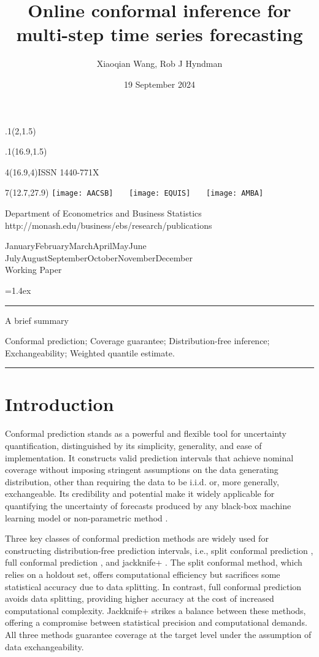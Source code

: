 \documentclass[
  11pt,
  a4paper,
]{article}
\title{Online conformal inference for multi-step time series
forecasting}
\date{19 September 2024}
\author{Xiaoqian Wang, Rob J Hyndman}
\makeatletter
\theoremstyle{plain}
\theoremstyle{remark}
\def\placefig#1#2#3#4{\begin{textblock}{.1}(#1,#2)\rlap{\texttt{[image: \#4]}}\end{textblock}}
\def\Date{\number\day}
\def\Month{\ifcase\month\or
 January\or February\or March\or April\or May\or June\or
 July\or August\or September\or October\or November\or December\fi}
\def\Year{\number\year}
\def\showjel{{\large\textsf{\textbf{JEL classification:}}~\@jel}}
\def\cover{{\sffamily\setcounter{page}{0}
        \thispagestyle{empty}
        \placefig{2}{1.5}{width=5cm}{monash2}
        \placefig{16.9}{1.5}{width=2.1cm}{MBSportrait}
        \begin{textblock}{4}(16.9,4)ISSN 1440-771X\end{textblock}
        \begin{textblock}{7}(12.7,27.9)\hfill
        \texttt{[image: AACSB]}~~~
        \texttt{[image: EQUIS]}~~~
        \texttt{[image: AMBA]}
        \end{textblock}
        \vspace*{2.5cm}
        \begin{center}\Large
        Department of Econometrics and Business Statistics\\[.5cm]
        \footnotesize http://monash.edu/business/ebs/research/publications
        \end{center}\vspace{2cm}
        \begin{center}
        \fbox{\parbox{14cm}{\begin{onehalfspace}\centering\Huge\vspace*{0.3cm}
                \textsf{\textbf{\expandafter{\@title}}}\vspace{1cm}\par
                \LARGE
                \expandafter{\@author}
                \end{onehalfspace}
        }}
        \end{center}
        \vfill
                \begin{center}\Large
                \Month~\Year\\[1cm]
                Working Paper \@wp
        \end{center}\vspace*{2cm}}}
\def\pageone{{\sffamily\setstretch{1}%
        \thispagestyle{empty}%
        \vbox to \textheight{%
        \raggedright\baselineskip=1.2cm
     {\fontsize{24.88}{30}\sffamily\textbf{\expandafter{\@title}}}
        \vspace{2cm}\par
        \hspace{1cm}\parbox{14cm}{\sffamily\large\@addresses}\vspace{1cm}\vfill
        \hspace{1cm}{\large\Date~\Month~\Year}\\[1cm]
        \hspace{1cm}\showjel\vss}}}
\def\blindtitle{{\sffamily
     \thispagestyle{plain}\raggedright\baselineskip=1.2cm
     {\fontsize{24.88}{30}\sffamily\textbf{\expandafter{\@title}}}\vspace{1cm}\par
        }}
\def\titlepage{{\cover\newpage\pageone\newpage\blindtitle}}
\let\maketitle\titlepage
\newenvironment{keywords}{\par\vspace{0.5cm}\noindent{\sffamily\textbf{Keywords:}}}{\vspace{0.25cm}\par\hrule\vspace{0.5cm}\par}
\renewenvironment{abstract}{\begin{minipage}{\textwidth}\parskip=1.4ex\noindent
\hrule\vspace{0.1cm}\par{\sffamily\textbf{\abstractname}}\newline\setstretch{1}}
  {\end{minipage}}
\makeatother
\begin{document}
\maketitle

\begin{abstract}
A brief summary
\end{abstract}

\begin{keywords}
  Conformal prediction; Coverage guarantee; Distribution-free
inference; Exchangeability; 
  Weighted quantile estimate.
\end{keywords}


\section{Introduction}\label{sec-intro}

Conformal prediction \autocite{vovk2005} stands as a powerful and
flexible tool for uncertainty quantification, distinguished by its
simplicity, generality, and ease of implementation. It constructs valid
prediction intervals that achieve nominal coverage without imposing
stringent assumptions on the data generating distribution, other than
requiring the data to be i.i.d. or, more generally, exchangeable. Its
credibility and potential make it widely applicable for quantifying the
uncertainty of forecasts produced by any black-box machine learning
model \autocite{shafer2008,papadopoulos2008,barber2021} or
non-parametric method \autocite{lei2014}.

Three key classes of conformal prediction methods are widely used for
constructing distribution-free prediction intervals, i.e., split
conformal prediction \autocite{vovk2005}, full conformal prediction
\autocite{vovk2005}, and jackknife+ \autocite{barber2021}. The split
conformal method, which relies on a holdout set, offers computational
efficiency but sacrifices some statistical accuracy due to data
splitting. In contrast, full conformal prediction avoids data splitting,
providing higher accuracy at the cost of increased computational
complexity. Jackknife+ strikes a balance between these methods, offering
a compromise between statistical precision and computational demands.
All three methods guarantee coverage at the target level under the
assumption of data exchangeability.
\end{document}
